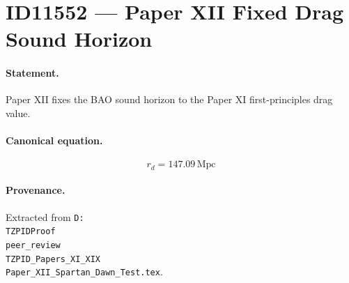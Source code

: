 \section*{ID11552 --- Paper XII Fixed Drag Sound Horizon}

\paragraph{Statement.}
Paper XII fixes the BAO sound horizon to the Paper XI first-principles drag value.

\paragraph{Canonical equation.}
\[
r_d=147.09\,\mathrm{Mpc}
\]

\paragraph{Provenance.}
Extracted from \texttt{D:\\TZPIDProof\\peer\_review\\TZPID\_Papers\_XI\_XIX\\Paper\_XII\_Spartan\_Dawn\_Test.tex}.
